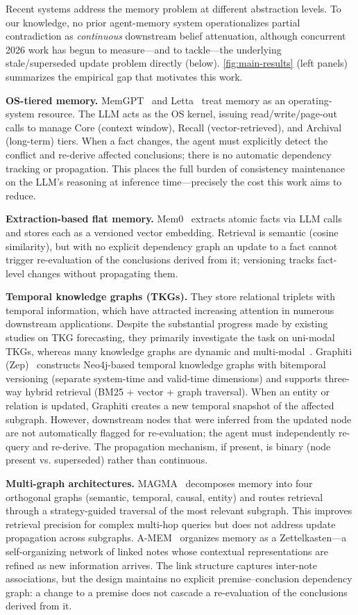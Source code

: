 \documentclass{article}
\theoremstyle{definition}
\begin{document}
Recent systems address the memory problem at different abstraction
levels.  To our knowledge, no prior agent-memory system operationalizes
partial contradiction as \emph{continuous} downstream belief
attenuation, although concurrent 2026 work has begun to measure---and to
tackle---the underlying stale/superseded update problem directly
(below). \cref{fig:main-results} (left panels) summarizes
the empirical gap that motivates this work.

\textbf{OS-tiered memory.} MemGPT~\cite{memgpt} and Letta~\cite{letta}
treat memory as an operating-system resource. The LLM acts as the OS
kernel, issuing read/write/page-out calls to manage Core (context
window), Recall (vector-retrieved), and Archival (long-term) tiers.
When a fact changes, the agent must explicitly detect the conflict and
re-derive affected conclusions; there is no automatic dependency
tracking or propagation. This places the full burden of consistency
maintenance on the LLM's reasoning at inference time---precisely the
cost this work aims to reduce.

\textbf{Extraction-based flat memory.} Mem0~\cite{mem0} extracts
atomic facts via LLM calls and stores each as a versioned vector
embedding. Retrieval is semantic (cosine similarity), but with no
explicit dependency graph an update to a fact cannot trigger
re-evaluation of the conclusions derived from it; versioning tracks
fact-level changes without propagating them.

\textbf{Temporal knowledge graphs (TKGs).} They
store relational triplets with temporal information, which have
attracted increasing attention in numerous downstream applications.
Despite the substantial progress made by existing studies on TKG
forecasting, they primarily investigate the task on uni-modal TKGs,
whereas many knowledge graphs are dynamic and
multi-modal~\cite{han2026temporal}. Graphiti (Zep)~\cite{zep}
constructs Neo4j-based temporal knowledge graphs with bitemporal
versioning (separate system-time and valid-time dimensions) and
supports three-way hybrid retrieval (BM25 + vector + graph traversal).
When an entity or relation is updated, Graphiti creates a new temporal
snapshot of the affected subgraph. However, downstream nodes that were
inferred from the updated node are not automatically flagged for
re-evaluation; the agent must independently re-query and re-derive.
The propagation mechanism, if present, is binary (node present vs.
superseded) rather than continuous.

\textbf{Multi-graph architectures.} MAGMA~\cite{magma2026} decomposes
memory into four orthogonal graphs (semantic, temporal, causal, entity)
and routes retrieval through a strategy-guided traversal of the most
relevant subgraph. This improves retrieval precision for complex
multi-hop queries but does not address update propagation across
subgraphs.
A-MEM~\cite{amem2026} organizes memory as a Zettelkasten---a
self-organizing network of linked notes whose contextual representations
are refined as new information arrives. The link structure captures
inter-note associations, but the design maintains no explicit
premise--conclusion dependency graph: a change to a premise does not
cascade a re-evaluation of the conclusions derived from it.
\end{document}

